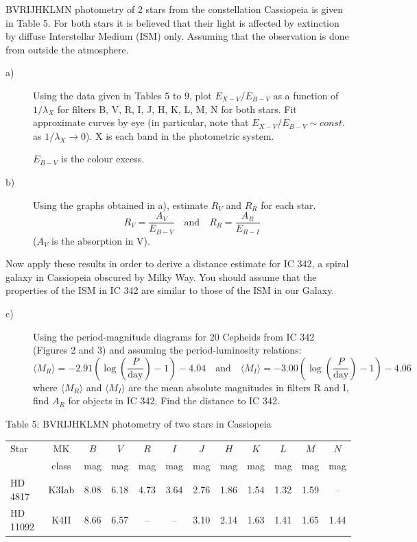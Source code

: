 BVRIJHKLMN photometry of 2 stars from the constellation Cassiopeia is given in
Table 5. For both stars it is believed that their light is affected by
extinction by diffuse Interstellar Medium (ISM) only. Assuming that the
observation is done from outside the atmosphere.

\begin{description}
\item[a)] Using the data given in Tables 5 to 9, plot $E_{X-V}/E_{B-V}$ as a
  function of $1/\lambda_X$ for filters B, V, R, I, J, H, K, L, M, N for both
  stars. Fit approximate curves by eye (in particular, note that
  $E_{X-V}/E_{B-V} \sim \mathit{const.}$ as $1/\lambda_X \to 0$). X is each
  band in the photometric system.

  $E_{B-V}$ is the colour excess.
\item[b)] Using the graphs obtained in a), estimate $R_V$ and $R_R$ for each
  star.
  \[ R_V = \frac{A_V}{E_{B-V}} \quad \text{and} \quad
     R_R = \frac{A_R}{E_{R-I}} \]
  ($A_V$ is the absorption in V).
\end{description}

Now apply these results in order to derive a distance estimate for IC 342, a
spiral galaxy in Cassiopeia obscured by Milky Way. You should assume that the
properties of the ISM in IC 342 are similar to those of the ISM in our Galaxy.

\begin{description}
\item[c)] Using the period-magnitude diagrams for 20 Cepheids from IC 342
  (Figures 2 and 3) and assuming the period-luminosity relations:
  \[ \langle M_R \rangle = -2.91 \left( \log\left(\frac{P}{\mathrm{day}}\right)
     - 1 \right) - 4.04 \quad \text{and} \quad
     \langle M_I \rangle = -3.00 \left( \log\left(\frac{P}{\mathrm{day}}\right)
     - 1 \right) - 4.06 \]
  where $\langle M_R \rangle$ and $\langle M_I \rangle$ are the mean absolute
  magnitudes in filters R and I, find $A_R$ for objects in IC 342. Find the
  distance to IC 342.
\end{description}

\medskip
\noindent Table 5: BVRIJHKLMN photometry of two stars in Cassiopeia

\begin{center}
\begin{tabular}{lccccccccccc}
\hline
Star & MK & $B$ & $V$ & $R$ & $I$ & $J$ & $H$ & $K$ & $L$ & $M$ & $N$ \\
 & class & mag & mag & mag & mag & mag & mag & mag & mag & mag & mag \\
\hline
HD 4817 & K3Iab & 8.08 & 6.18 & 4.73 & 3.64 & 2.76 & 1.86 & 1.54 & 1.32 &
  1.59 & -- \\
HD 11092 & K4II & 8.66 & 6.57 & -- & -- & 3.10 & 2.14 & 1.63 & 1.41 & 1.65 &
  1.44 \\
\hline
\end{tabular}
\end{center}

